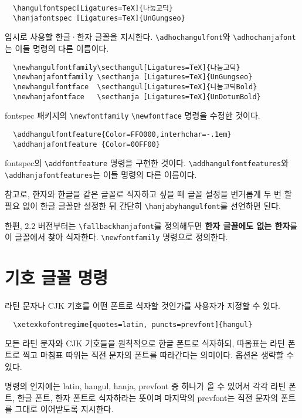\documentclass[a4paper]{article}
\def\cs#1{\texttt{\textbackslash #1}}
\def\hemph#1{\textsf{\bfseries #1}}
\begin{document}
\begin{verbatim}
  \hangulfontspec[Ligatures=TeX]{나눔고딕}
  \hanjafontspec [Ligatures=TeX]{UnGungseo}
\end{verbatim}
임시로 사용할 한글·한자 글꼴을 지시한다.
\cs{adhochangulfont}와 \cs{adhochanjafont}는 이들 명령의 다른 이름이다.

\begin{verbatim}
  \newhangulfontfamily\secthangul[Ligatures=TeX]{나눔고딕}
  \newhanjafontfamily \secthanja [Ligatures=TeX]{UnGungseo}
  \newhangulfontface  \secthangul[Ligatures=TeX]{나눔고딕Bold}
  \newhanjafontface   \secthanja [Ligatures=TeX]{UnDotumBold}
\end{verbatim}
fontspec 패키지의 \verb+\newfontfamily+ \verb+\newfontface+ 명령을
수정한 것이다.

\begin{verbatim}
  \addhangulfontfeature{Color=FF0000,interhchar=-.1em}
  \addhanjafontfeature {Color=00FF00}
\end{verbatim}
fontspec의 \verb+\addfontfeature+ 명령을 구현한 것이다.
\cs{addhangulfontfeatures}와\\ \cs{addhanjafontfeatures}는
이들 명령의 다른 이름이다.

\smallskip
참고로, 한자와 한글을 같은 글꼴로 식자하고 싶을 때 글꼴 설정을
번거롭게 두 번 할 필요 없이 한글 글꼴만 설정한 뒤 간단히
  \cs{hanjabyhangulfont}를 선언하면 된다.

한편, 2.2 버전부터는 \cs{fallbackhanjafont}를 정의해두면
\hemph{한자 글꼴에도 없는 한자}를
이 글꼴에서 찾아 식자한다. \verb|\newfontfamily| 명령으로 정의한다.


\section{기호 글꼴 명령}
라틴 문자나 CJK 기호를 어떤 폰트로 식자할 것인가를 사용자가 지정할 수 있다.
\begin{verbatim}
  \xetexkofontregime[quotes=latin, puncts=prevfont]{hangul}
\end{verbatim}
모든 라틴 문자와 CJK 기호들을 원칙적으로 한글 폰트로 식자하되,
따옴표는 라틴 폰트로 찍고 마침표 따위는 직전 문자의 폰트를 따라간다는 의미이다.
옵션은 생략할 수 있다.

명령의 인자에는 latin, hangul, hanja, prevfont 중 하나가 올 수 있어서
각각 라틴 폰트, 한글 폰트, 한자 폰트로 식자하라는 뜻이며
마지막의 prevfont는 직전 문자의 폰트를 그대로 이어받도록 지시한다.
\end{document}
